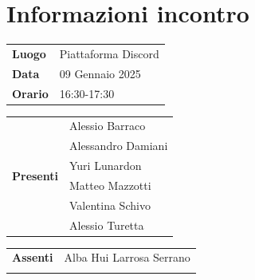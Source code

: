 \section{Informazioni incontro}
\vspace{0.25cm}
\begin{tabular}{p{1.75cm} | l}
    \textbf{Luogo} & Piattaforma Discord\\
    \textbf{Data} & 09 Gennaio 2025\\
    \textbf{Orario} & 16:30-17:30\\
\end{tabular}

\vspace{0.5cm}
\noindent
\begin{tabular}{p{1.75cm} | l}
    \multirow{7}{*}{\textbf{Presenti}}
        & Alessio Barraco\\
        & Alessandro Damiani \\ %
        & Yuri Lunardon\\
        & Matteo Mazzotti\\
        & Valentina Schivo\\
        & Alessio Turetta
\end{tabular}

\vspace{0.5cm}
\noindent
\begin{tabular}{p{1.75cm} | l}
    \multirow{1}{*}{\textbf{Assenti}}
        & Alba Hui Larrosa Serrano\\\\
\end{tabular}

